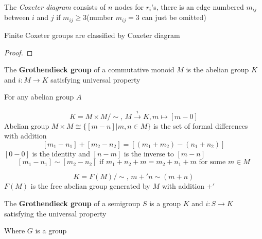 \documentclass[main]{subfiles}
\begin{document}
\begin{definition}
The \textit{Coxeter diagram} consists of $n$ nodes for $r_i$'s, there is an edge numbered $m_{ij}$ between $i$ and $j$ if $m_{ij}\geq3$(number $m_{ij}=3$ can just be omitted)
\end{definition}

\begin{theorem}
Finite Coxeter groups are classified by Coxeter diagram
\end{theorem}

\begin{proof}

\end{proof}

\begin{definition}\label{Grothendieck group}
The \textbf{Grothendieck group} of a commutative monoid $M$ is the abelian group $K$ and $i: M\to K$ satisfying universal property
\begin{center}
\end{center}
For any abelian group $A$
\end{definition}

\begin{construction}
\[K=M\times M/\sim,\,M\xrightarrow i K, m\mapsto [m-0]\]
Abelian group $M\times M\cong\{[m-n]|m,n\in M\}$ is the set of formal differences with addition
\[[m_1-n_1]+[m_2-n_2]=[(m_1+m_2)-(n_1+n_2)]\]
$[0-0]$ is the identity and $[n-m]$ is the inverse to $[m-n]$
\[[m_1-n_1]\sim [m_2-n_2] \text{ if } m_1+n_2+m=m_2+n_1+m \text{ for some }m\in M\]
\end{construction}

\begin{construction}
\[K=F(M)/\sim,\,m+'n\sim(m+n)\]
$F(M)$ is the free abelian group generated by $M$ with addition $+'$
\end{construction}

\begin{definition}
The \textbf{Grothendieck group} of a semigroup $S$ is a group $K$ and $i: S\to K$ satisfying the universal property
\begin{center}
\end{center}
Where $G$ is a group
\end{definition}
\end{document}
